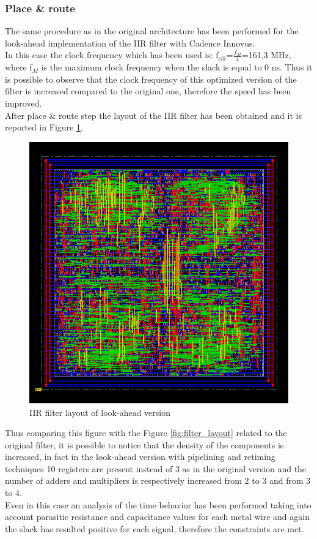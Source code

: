 \documentclass[a4paper, titlepage]{article}
\begin{document}
\subsubsection{Place \& route}
The same procedure as in the original architecture has been performed for the look-ahead implementation of the IIR filter with Cadence Innovus.\\In this case the clock frequency which has been used is: f$_{clk}$=$\frac{f_M}{4}$=161,3 MHz, where f$_M$ is the maximum clock frequency when the slack is equal to 0 ns. Thus it is possible to observe that the clock frequency of this optimized version of the filter is increased compared to the original one, therefore the speed has been improved.\\%
After place $\&$ route step the layout of the IIR filter has been obtained and it is reported in Figure \ref{fig:filter_layout_LA}.
 \begin{figure} [h]
\centering
	\includegraphics[scale=0.7]{layout_filter_LA.PNG}
	\caption{IIR filter layout of look-ahead version}
	\label{fig:filter_layout_LA}
\end{figure}
\noindent
\newline
Thus comparing this figure with the Figure \ref{fig:filter_layout} related to the original filter, it is possible to notice that the density of the components is increased, in fact in the look-ahead version with pipelining and retiming techniques 10 registers are present instead of 3 as in the original version and the number of adders and multipliers is respectively increased from 2 to 3 and from 3 to 4.\\Even in this case an analysis of the time behavior has been performed taking into account  parasitic resistance and capacitance values for each metal wire and again the slack has resulted positive for each signal, therefore the constraints are met.
\end{document}
